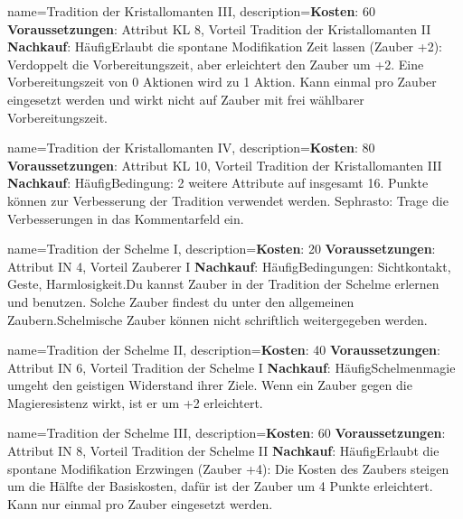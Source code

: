 {
    name={Tradition der Kristallomanten III},
    description={\textbf{Kosten}: 60 \textbf{Voraussetzungen}: Attribut KL 8, Vorteil Tradition der Kristallomanten II \textbf{Nachkauf}: Häufig\newline Erlaubt die spontane Modifikation Zeit lassen (Zauber +2): Verdoppelt die Vorbereitungszeit, aber erleichtert den Zauber um +2. Eine Vorbereitungszeit von 0 Aktionen wird zu 1 Aktion. Kann einmal pro Zauber eingesetzt werden und wirkt nicht auf Zauber mit frei wählbarer Vorbereitungszeit.}
}


{
    name={Tradition der Kristallomanten IV},
    description={\textbf{Kosten}: 80 \textbf{Voraussetzungen}: Attribut KL 10, Vorteil Tradition der Kristallomanten III \textbf{Nachkauf}: Häufig\newline Bedingung: 2 weitere Attribute auf insgesamt 16. Punkte können zur Verbesserung der Tradition verwendet werden. Sephrasto: Trage die Verbesserungen in das Kommentarfeld ein.}
}


{
    name={Tradition der Schelme I},
    description={\textbf{Kosten}: 20 \textbf{Voraussetzungen}: Attribut IN 4, Vorteil Zauberer I \textbf{Nachkauf}: Häufig\newline Bedingungen: Sichtkontakt, Geste, Harmlosigkeit.\newline Du kannst Zauber in der Tradition der Schelme erlernen und benutzen. Solche Zauber findest du unter den allgemeinen Zaubern.\newline Schelmische Zauber können nicht schriftlich weitergegeben werden.}
}


{
    name={Tradition der Schelme II},
    description={\textbf{Kosten}: 40 \textbf{Voraussetzungen}: Attribut IN 6, Vorteil Tradition der Schelme I \textbf{Nachkauf}: Häufig\newline Schelmenmagie umgeht den geistigen Widerstand ihrer Ziele. Wenn ein Zauber gegen die Magieresistenz wirkt, ist er um +2 erleichtert.}
}


{
    name={Tradition der Schelme III},
    description={\textbf{Kosten}: 60 \textbf{Voraussetzungen}: Attribut IN 8, Vorteil Tradition der Schelme II \textbf{Nachkauf}: Häufig\newline Erlaubt die spontane Modifikation Erzwingen (Zauber +4): Die Kosten des Zaubers steigen um die Hälfte der Basiskosten, dafür ist der Zauber um 4 Punkte erleichtert. Kann nur einmal pro Zauber eingesetzt werden.}
}


